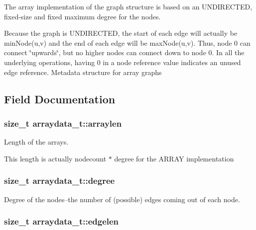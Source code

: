 The array implementation of the graph structure is based on an U\+N\+D\+I\+R\+E\+C\+T\+ED, fixed-\/size and fixed maximum degree for the nodes.

Because the graph is U\+N\+D\+I\+R\+E\+C\+T\+ED, the start of each edge will actually be min\+Node(u,v) and the end of each edge will be max\+Node(u,v). Thus, node 0 can connect \char`\"{}upwards\char`\"{}, but no higher nodes can connect down to node 0. In all the underlying operations, having 0 in a node reference value indicates an unused edge reference. Metadata structure for array graphs 

\subsection{Field Documentation}
\subsubsection[{\texorpdfstring{arraylen}{arraylen}}]{\setlength{\rightskip}{0pt plus 5cm}size\+\_\+t arraydata\+\_\+t\+::arraylen}\hypertarget{structarraydata__t_a2a07b4b41c935e1a5acba14d3df92a45}{}\label{structarraydata__t_a2a07b4b41c935e1a5acba14d3df92a45}


Length of the arrays. 

This length is actually nodecount $\ast$ degree for the A\+R\+R\+AY implementation 
\subsubsection[{\texorpdfstring{degree}{degree}}]{\setlength{\rightskip}{0pt plus 5cm}size\+\_\+t arraydata\+\_\+t\+::degree}\hypertarget{structarraydata__t_af48476cee5ba6969a23157f07788f304}{}\label{structarraydata__t_af48476cee5ba6969a23157f07788f304}


Degree of the nodes--the number of (possible) edges coming out of each node. 

\subsubsection[{\texorpdfstring{edgelen}{edgelen}}]{\setlength{\rightskip}{0pt plus 5cm}size\+\_\+t arraydata\+\_\+t\+::edgelen}\hypertarget{structarraydata__t_a1bcdcd2b541e02eb0d20be0563a1f447}{}\label{structarraydata__t_a1bcdcd2b541e02eb0d20be0563a1f447}


